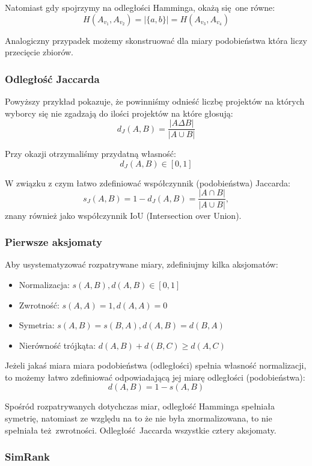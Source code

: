 \documentclass{article}
\begin{document}
Natomiast gdy spojrzymy na odległości Hamminga, okażą się one równe:
\[ H(A_{v_1},A_{v_2}) = |\{a,b\}| = H(A_{v_3},A_{v_4}) \]

Analogiczny przypadek możemy skonstruować dla miary podobieństwa która liczy
przecięcie zbiorów.

\subsubsection{Odległość Jaccarda}

Powyższy przykład pokazuje, że powinniśmy odnieść liczbę projektów na których
wyborcy się nie zgadzają do ilości projektów na które głosują:
\[ d_J(A,B) = \frac{|A \Delta B|}{|A \cup B|} \]

Przy okazji otrzymaliśmy przydatną własność:
\[ d_J(A,B) \in [0, 1] \]

W związku z czym łatwo zdefiniować współczynnik (podobieństwa) Jaccarda:
\[ s_J(A,B) = 1 - d_J(A,B) = \frac{|A \cap B|}{|A \cup B|}, \]
znany również jako współczynnik IoU (Intersection over Union).

\subsubsection*{Pierwsze aksjomaty}

Aby usystematyzować rozpatrywane miary, zdefiniujmy kilka aksjomatów:

\begin{itemize}
  \item Normalizacja: $s(A,B),d(A,B) \in [0, 1]$
  \item Zwrotność: $s(A,A) = 1, d(A,A) = 0$
  \item Symetria: $s(A,B) = s(B,A), d(A,B) = d(B,A)$
  \item Nierówność trójkąta: $d(A,B) + d(B,C) \geq d(A,C)$
\end{itemize}

Jeżeli jakaś miara miara podobieństwa (odległości) spełnia własność
normalizacji, to możemy łatwo zdefiniować odpowiadającą jej miarę odległości
(podobieństwa):
\[ d(A,B) = 1 - s(A,B) \]

Spośród rozpatrywanych dotychczas miar, odległość Hamminga spełniała
symetrię, natomiast ze względu na to że nie była znormalizowana, to nie
spełniała też zwrotności. Odległość Jaccarda wszystkie cztery aksjomaty.

\subsubsection{SimRank}
\end{document}
